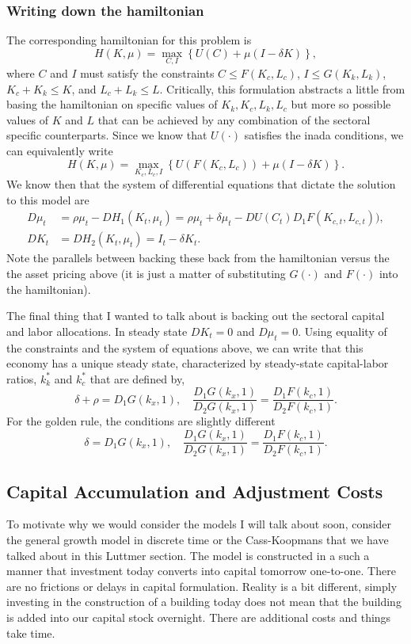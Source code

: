 \documentclass[11pt,english]{article}
\begin{document}
\subsubsection{Writing down the hamiltonian}
The corresponding hamiltonian for this problem is $$H(K, \mu) = \max_{C,I}\left\{U(C) + \mu(I - \delta K)\right\},$$where $C$ and $I$ must satisfy the constraints $C \leq F(K_c, L_c)$, $I \leq G(K_k, L_k)$, $K_c + K_k \leq K$, and $L_c + L_k \leq L$. Critically, this formulation abstracts a little from basing the hamiltonian on specific values of $K_k, K_c, L_k, L_c$ but more so possible values of $K$ and $L$ that can be achieved by any combination of the sectoral specific counterparts. Since we know that $U(\cdot)$ satisfies the inada conditions, we can equivalently write  $$H(K, \mu) = \max_{K_c, L_c,I}\left\{U(F(K_c, L_c)) + \mu(I - \delta K)\right\}.$$ We know then that the system of differential equations that dictate the solution to this model are
\begin{align*}
D\mu_t &= \rho \mu_t - DH_1(K_t, \mu_t) = \rho \mu_t + \delta\mu_t - DU(C_t) D_1F(K_{c,t}, L_{c,t})),\\
DK_t &= DH_2(K_t, \mu_t) = I_t - \delta K_t.
\end{align*}Note the parallels between backing these back from the hamiltonian versus the the asset pricing above (it is just a matter of substituting $G(\cdot)$ and $F(\cdot)$ into the hamiltonian).

The final thing that I wanted to talk about is backing out the sectoral capital and labor allocations. In steady state $DK_t = 0$ and $D\mu_t = 0$. Using equality of the constraints and the system of equations above, we can write that this economy has a unique steady state, characterized by steady-state capital-labor ratios, $k_k^*$ and $k_c^*$ that are defined by, $$\delta + \rho = D_1G(k_x, 1),\quad \frac{D_1G(k_x, 1)}{D_2G(k_x, 1)} = \frac{D_1 F(k_c, 1)}{D_2 F(k_c, 1)}.$$
For the golden rule, the conditions are slightly different $$\delta = D_1G(k_x, 1),\quad \frac{D_1G(k_x, 1)}{D_2G(k_x, 1)} = \frac{D_1 F(k_c, 1)}{D_2 F(k_c, 1)}.$$

\subsection{Capital Accumulation and Adjustment Costs}
To motivate why we would consider the models I will talk about soon, consider the general growth model in discrete time or the Cass-Koopmans that we have talked about in this Luttmer section. The model is constructed in a such a manner that investment today converts into capital tomorrow one-to-one. There are no frictions or delays in capital formulation. Reality is a bit different, simply investing in the construction of a building today does not mean that the building is added into our capital stock overnight. There are additional costs and things take time.
\end{document}
